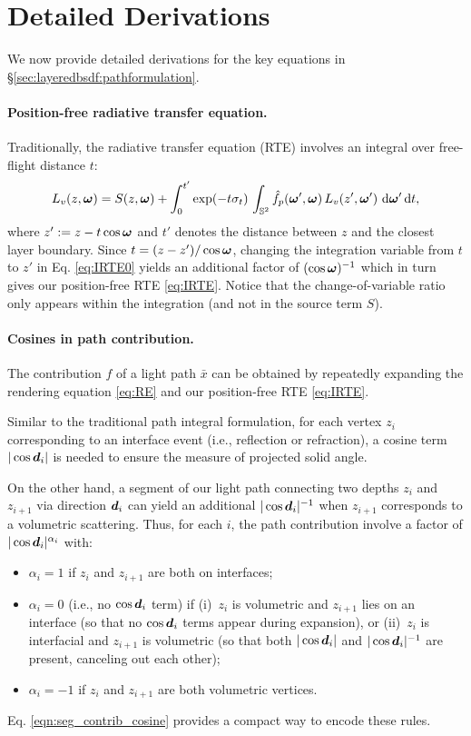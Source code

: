 \section{Detailed Derivations}
\label{sec:layeredbsdf:derivation}

We now provide detailed derivations for the key equations in \S\ref{sec:layeredbsdf:pathformulation}.

\paragraph{Position-free radiative transfer equation.}
Traditionally, the radiative transfer equation (RTE) involves an integral over free-flight distance $t$:
\begin{equation}
\label{eq:IRTE0}
  L_v(z, \bm\omega) = S(z, \bm\omega) + \int_0^{t'} \exp(-t \sigma_t) \, \int_{\mathbb{S}^2} \hat f_p(\bm\omega', \bm\omega) \, L_v(z', \bm\omega') \,\,\mathrm{d} \bm\omega' \,\mathrm{d} t,
\end{equation}
where $z' := z - t\cos\bm\omega$ and $t'$ denotes the distance between $z$ and the closest layer boundary.
Since $t = (z - z')/\cos\bm\omega$, changing the integration variable from $t$ to $z'$ in Eq. \eqref{eq:IRTE0} yields an additional factor of $(\cos\bm\omega)^{-1}$ which in turn gives our position-free RTE \eqref{eq:IRTE}.
Notice that the change-of-variable ratio only appears within the integration (and not in the source term $S$).

\paragraph{Cosines in path contribution.}
The contribution $f$ of a light path $\bar{x}$ can be obtained by repeatedly expanding the rendering equation \eqref{eq:RE} and our position-free RTE \eqref{eq:IRTE}.

Similar to the traditional path integral formulation, for each vertex $z_i$ corresponding to an interface event (i.e., reflection or refraction), a cosine term $|\cos\bm{d}_i|$ is needed to ensure the measure of projected solid angle.

On the other hand, a segment of our light path connecting two depths $z_i$ and $z_{i + 1}$ via direction $\bm{d}_i$ can yield an additional $|\cos\bm{d}_i|^{-1}$ when $z_{i + 1}$ corresponds to a volumetric scattering.
Thus, for each $i$, the path contribution involve a factor of $|\cos\bm{d}_i|^{\alpha_i}$ with:
\begin{itemize}
	\item $\alpha_i = 1$ if $z_i$ and $z_{i + 1}$ are both on interfaces;
	\item $\alpha_i = 0$ (i.e., no $\cos\bm{d}_i$ term) if (i)~$z_i$ is volumetric and $z_{i + 1}$ lies on an interface (so that no $\cos\bm{d}_i$ terms appear during expansion), or (ii)~$z_i$ is interfacial and $z_{i + 1}$ is volumetric (so that both $|\cos\bm{d}_i|$ and $|\cos\bm{d}_i|^{-1}$ are present, canceling out each other);
	\item $\alpha_i = -1$ if $z_i$ and $z_{i + 1}$ are both volumetric vertices.
\end{itemize}
Eq. \eqref{eqn:seg_contrib_cosine} provides a compact way to encode these rules. 
